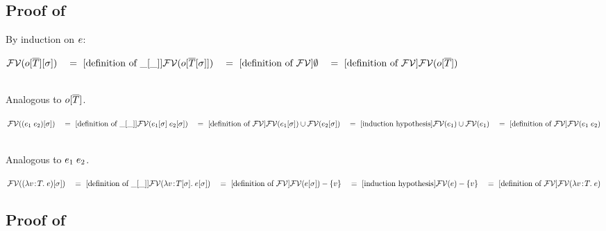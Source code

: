 \subsection*{Proof of }

By induction on $e$:
\begin{bycase}
\Case{$\var$}
\Case{$\opO$}
\begin{links}
$\mathcal{FV}(o[\overline{T}][\sigma])
 \\\hspace*{1em}=\ [\mbox{definition of $\_[\_]$}]\\
 \mathcal{FV}(o[\overline{T}[\sigma]])
 \\\hspace*{1em}=\ [\mbox{definition of $\mathcal{FV}$}]\\
 \emptyset
 \\\hspace*{1em}=\ [\mbox{definition of $\mathcal{FV}$}]\\
 \mathcal{FV}(o[\overline{T}])$
\end{links}
\Case{$\descopO$, $\pjop{\fnam}$}\\
Analogous to $\opO$.
\Case{$\appO$}
\begin{links}
$\mathcal{FV}((e_1\;e_2)[\sigma])
 \\\hspace*{1em}=\ [\mbox{definition of $\_[\_]$}]\\
 \mathcal{FV}(e_1[\sigma]\;e_2[\sigma])
 \\\hspace*{1em}=\ [\mbox{definition of $\mathcal{FV}$}]\\
 \mathcal{FV}(e_1[\sigma])\cup\mathcal{FV}(e_2[\sigma])
 \\\hspace*{1em}=\ [\mbox{induction hypothesis}]\\
 \mathcal{FV}(e_1)\cup\mathcal{FV}(e_1)
 \\\hspace*{1em}=\ [\mbox{definition of $\mathcal{FV}$}]\\
 \mathcal{FV}(e_1\;e_2)$
\end{links}
\Case{$\eqO$, $\iifO$}\\
Analogous to $\appO$.
\Case{$\absO$}
\begin{links}
$\mathcal{FV}((\lambda v\!:\!T.\;e)[\sigma])
 \\\hspace*{1em}=\ [\mbox{definition of $\_[\_]$}]\\
 \mathcal{FV}(\lambda v\!:\!T[\sigma].\;e[\sigma])
 \\\hspace*{1em}=\ [\mbox{definition of $\mathcal{FV}$}]\\
 \mathcal{FV}(e[\sigma])-\{v\}
 \\\hspace*{1em}=\ [\mbox{induction hypothesis}]\\
 \mathcal{FV}(e)-\{v\}
 \\\hspace*{1em}=\ [\mbox{definition of $\mathcal{FV}$}]\\
 \mathcal{FV}(\lambda v\!:\!T.\;e)$
\end{links}
\end{bycase}



\subsection*{Proof of }

